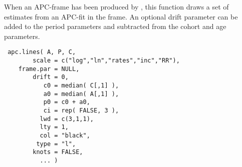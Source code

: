 \begin{Description}\relax
When an APC-frame has been produced by , this
function draws a set of estimates from an APC-fit in the frame. An
optional drift parameter can be added to the period parameters and
subtracted from the cohort and age parameters.
\end{Description}
\begin{Usage}
\begin{verbatim}
 apc.lines( A, P, C,
        scale = c("log","ln","rates","inc","RR"),
    frame.par = NULL,
        drift = 0,
           c0 = median( C[,1] ),
           a0 = median( A[,1] ),
           p0 = c0 + a0,
           ci = rep( FALSE, 3 ),
          lwd = c(3,1,1),
          lty = 1,
          col = "black",
         type = "l",
        knots = FALSE,
          ... )
\end{verbatim}
\end{Usage}
